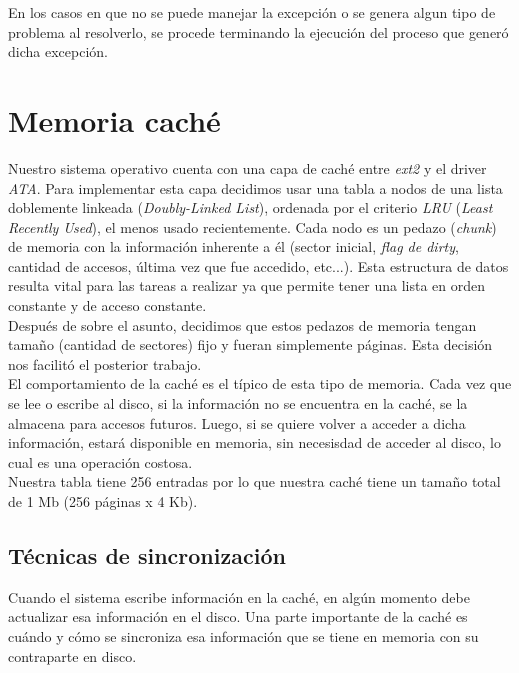 \documentclass[a4paper,10pt]{article}
\begin{document}
En los casos en que no se puede manejar la excepción o se genera algun tipo de problema al resolverlo, se procede terminando la ejecución del proceso que generó dicha excepción.

\newpage

\section{Memoria caché}

Nuestro sistema operativo cuenta con una capa de caché entre \textit{ext2} y el driver \textit{ATA}. Para implementar esta capa decidimos usar una tabla 
a nodos de una lista doblemente linkeada (\textit{Doubly-Linked List}), ordenada por el criterio \textit{LRU} (\textit{Least Recently Used}), el menos usado
 recientemente. Cada nodo es un pedazo (\textit{chunk}) de memoria con la información inherente a él (sector inicial, \textit{flag de dirty}, 
cantidad de accesos, última vez que fue accedido, etc...). Esta estructura de datos resulta vital para las tareas a realizar ya que permite tener una lista
en orden constante y de acceso constante.\\

Después de sobre el asunto, decidimos que estos pedazos de memoria tengan tamaño (cantidad de sectores)
fijo y fueran simplemente páginas. Esta decisión nos facilitó el posterior trabajo.\\

El comportamiento de la caché es el típico de esta tipo de memoria. Cada vez que se lee o escribe al disco, si la información no se encuentra en la caché, se
 la almacena para accesos futuros. Luego, si se quiere volver a acceder a dicha información, estará disponible en memoria, sin necesisdad de acceder al disco, lo 
cual es una operación costosa.\\


Nuestra tabla tiene 256 entradas por lo que nuestra caché tiene un tamaño total de 1 Mb (256 páginas x 4 Kb).\\

        \subsection{Técnicas de sincronización}

        Cuando el sistema escribe información en la caché, en algún momento debe actualizar esa información en el disco. Una parte importante de la caché es cuándo y
        cómo se sincroniza esa información que se tiene en memoria con su contraparte en disco. \\
\end{document}
